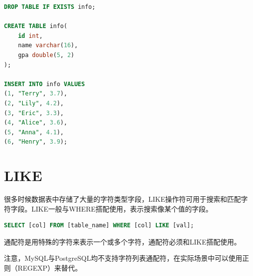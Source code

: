 \documentclass[12pt, openany, oneside]{book}
\begin{document}

\begin{lstlisting}[language=SQL]
DROP TABLE IF EXISTS info;

CREATE TABLE info(
    id int,
    name varchar(16),
    gpa double(5, 2)
);

INSERT INTO info VALUES
(1, "Terry", 3.7),
(2, "Lily", 4.2),
(3, "Eric", 3.3),
(4, "Alice", 3.6),
(5, "Anna", 4.1),
(6, "Henry", 3.9);
\end{lstlisting}

\section{LIKE}

很多时候数据表中存储了大量的字符类型字段，LIKE操作符可用于搜索和匹配字符字段。LIKE一般与WHERE搭配使用，表示搜索像某个值的字段。

\vspace{-0.5cm}

\begin{lstlisting}[language=SQL]
SELECT [col] FROM [table_name] WHERE [col] LIKE [val];
\end{lstlisting}

通配符是用特殊的字符来表示一个或多个字符，通配符必须和LIKE搭配使用。

\begin{table}[H]
    \centering
    \caption{通配符}
\end{table}

注意，MySQL与PostgreSQL均不支持字符列表通配符，在实际场景中可以使用正则（REGEXP）来替代。 \\

 \\
\end{document}
